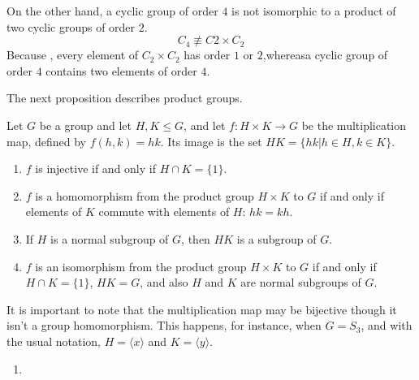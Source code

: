 \documentclass[
]{book}
\providecommand{\tightlist}{%
  \setlength{\itemsep}{0pt}\setlength{\parskip}{0pt}}
\begin{document}
\leavevmode{}%
On the other hand, a cyclic group of order \(4\) is not isomorphic to a
product of two cyclic groups of order \(2\).
\[C_4\not\equiv C2 \times C_2\] Because , every element of
\(C_2 \times C_2\) has order \(1\) or \(2\),whereasa cyclic group of
order \(4\) contains two elements of order \(4\).

The next proposition describes product groups.

\leavevmode{}%
Let \(G\) be a group and let \(H,K\leq G\), and let
\(f: H \times K \rightarrow G\) be the multiplication map, defined by
\(f(h, k) = hk\). Its image is the set
\(HK = \{hk | h \in H, k \in K\}\).

\begin{enumerate}
\def\labelenumi{\alph{enumi}.}
\tightlist
\item
  \(f\) is injective if and only if \(H \cap K = \{1\}\).
\item
  \(f\) is a homomorphism from the product group \(H \times K\) to \(G\)
  if and only if elements of \(K\) commute with elements of \(H\):
  \(hk = kh\).
\item
  If \(H\) is a normal subgroup of \(G\), then \(HK\) is a subgroup of
  \(G\).
\item
  \(f\) is an isomorphism from the product group \(H \times K\) to \(G\)
  if and only if \(H \cap K = \{1\}\), \(HK = G\), and also \(H\) and
  \(K\) are normal subgroups of \(G\).
\end{enumerate}

It is important to note that the multiplication map may be bijective
though it isn't a group homomorphism. This happens, for instance, when
\(G = S_3\), and with the usual notation, \(H = \langle x \rangle\) and
\(K = \langle y \rangle\).

\begin{enumerate}
\def\labelenumi{\alph{enumi}.}
\tightlist
\item
\end{enumerate}
\end{document}
